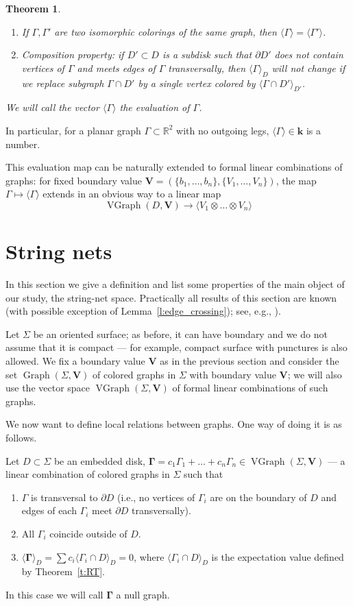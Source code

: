 \documentclass{amsart}
\newtheorem{theorem}{Theorem}[section]
\theoremstyle{definition}
\theoremstyle{remark}
\numberwithin{equation}{section}
\newcommand{\thref}[1]{Theorem~{\rm\ref{#1}}}
\newcommand{\leref}[1]{Lemma~{\rm\ref{#1}}}
\newcommand{\del}{\partial}
\newcommand{\<}{\langle}
\renewcommand{\>}{\rangle}
\newcommand{\kk}{\mathbf{k}}       %
\newcommand{\R}{\mathbb{R}}       %
\newcommand{\VV}{\mathbf{V}}       %
\newcommand{\Ga}{\Gamma}
\newcommand{\Si}{\Sigma}
\DeclareMathOperator{\Gr}{Graph}
\DeclareMathOperator{\VGr}{VGraph}
\begin{document}
\begin{theorem}
\begin{enumerate}
    \item If $\Ga,\Ga'$ are two isomorphic colorings of the same graph,
      then $\<\Ga\>=\<\Ga'\>$. 
    \item Composition property: if $D'\subset D$ is a subdisk such
      that $\del D'$ does not contain vertices of $\Ga$ and meets edges of
      $\Ga$ transversally, then   $\<\Ga\>_D$ will not change if we replace
      subgraph $\Ga\cap D'$ by a single vertex colored by
      $\<\Ga\cap D'\>_{D'}$.

  \end{enumerate}
We will call the vector $\<\Ga\>$ the {\em evaluation} of $\Ga$.
\end{theorem}

In particular, for a planar graph $\Ga\subset \R^2$ with no outgoing
legs, $\<\Ga\>\in \kk$ is a number. 

This evaluation map can be naturally extended to formal linear combinations 
of graphs: for fixed boundary value $\VV=(\{b_1,\dots, b_n\},\{V_1,\dots,
V_n\})$,  the map $\Ga\mapsto \<\Ga\>$ extends in an obvious way to a
linear map 
$$
\VGr(D,\VV)\to \<V_1\otimes\dots\otimes V_n\>
$$



\section{String nets}\label{s:sn}

In this section we give a definition and list some properties of the
main object of our study, the string-net space. Practically all results of
this section are known (with possible  exception of
\leref{l:edge_crossing}); see, e.g., ).

Let $\Si$ be an oriented   surface; as before, it can have boundary and we 
 do not assume that it is compact --- for example, compact surface with
punctures is also allowed. We fix a boundary value $\VV$ as in the previous
section and consider the set $\Gr(\Si,\VV)$ of  colored graphs in $\Si$
with boundary value $\VV$; we will also use  the vector space $\VGr(
\Si,\VV)$ of formal linear combinations of such graphs.

We now want to define local relations between graphs. One way of doing it 
is as follows.

Let $D\subset \Si$ be an embedded disk, 
$\mathbf\Ga=c_1\Ga_1+\dots+c_n\Ga_n \in \VGr(\Si,\VV)$  --- a linear
combination of colored graphs in $\Si$ such that
\begin{enumerate}
  \item $\Ga$ is transversal to $\del D$ (i.e., no vertices of $\Ga_i$ 
      are on the boundary of $D$ and edges of each $\Ga_i$ meet 
      $\del D$ transversally).
  \item All $\Ga_i$ coincide outside of $D$.
  \item $\<\mathbf{\Ga}\>_D=\sum c_i\<\Ga_i\cap D\>_D=0$, where
      $\<\Ga_i\cap D\>_D$ is the expectation value defined by \thref{t:RT}.
\end{enumerate}
In this case we will call $\mathbf{\Ga}$ a null graph. 
\end{document}
